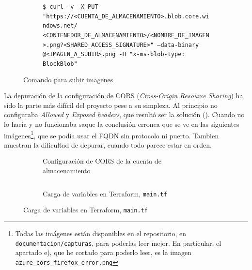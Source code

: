 \documentclass[11pt]{article}
\begin{document}
\begin{flushleft}
		\begin{figure}[htb]
			\centering
			\begin{subfigure}{\textwidth}
				\footnotesize
				\texttt{\$ curl -v -X PUT "https://<CUENTA\_DE\_ALMACENAMIENTO>.blob.core.windows.net/\\<CONTENEDOR\_DE\_ALMACENAMIENTO>/<NOMBRE\_DE\_IMAGEN>.png?<SHARED\_ACCESS\_SIGNATURE>"\ --data-binary @<IMAGEN\_A\_SUBIR>.png -H "x-ms-blob-type: BlockBlob"} 
			\end{subfigure}
			Comando para subir imagenes 
		\end{figure}

	\clearpage
	La depuración de la configuración de CORS (\textit{Cross-Origin Resource Sharing}) ha sido la parte más difícil del proyecto pese a su simpleza. Al principio no configuraba  \textit{Allowed} y \textit{Exposed headers}, que resultó ser la solución (\cite{cors_almacen}). Cuando no lo hacía y no funcionaba saque la conclusión erronea que se ve en las siguientes imágenes\footnote{Todas las imágenes están disponibles en el repositorio, en \texttt{documentacion/capturas}, para poderlas leer mejor. En particular, el apartado e), que he cortado para poderlo leer, es la imagen \texttt{azure\_cors\_firefox\_error.png}}, que se podía usar el FQDN sin protocolo ni puerto. Tambien muestran la dificultad de depurar, cuando todo parece estar en orden.
	\linebreak

		\begin{figure}[htb]
			\centering
			\begin{subfigure}{\textwidth}
				\centering
				\caption{Configuración de CORS de la cuenta de almacenamiento}
			\end{subfigure}
			\linebreak
			
			\begin{subfigure}{.92\linewidth}
				\inputminted[fontsize=\tiny, firstline=33, lastline=36, linenos, frame=single, breaklines]{javascript}{../../frontend/terraform/main.tf}
				\vspace{-.5cm}
				\caption{Carga de variables en Terraform, \texttt{main.tf}}
			\end{subfigure}
			\linebreak
			

\end{figure}
\end{flushleft}
\end{document}
